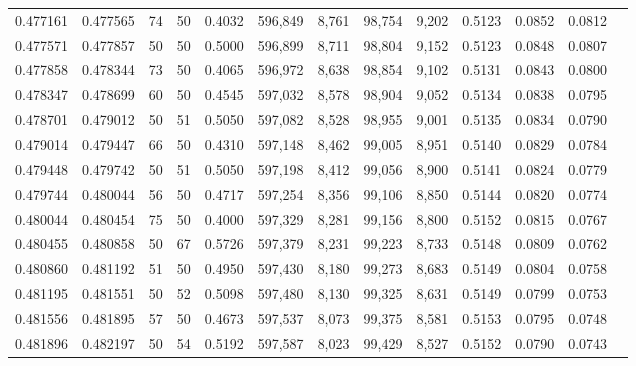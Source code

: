 \begin{tabular}{rrrrrrrrrrrrr}
0.477161 & 0.477565 &    74 &  50 &                                     0.4032 & 596,849 &   8,761 &  98,754 &   9,202 & 0.5123 & 0.0852 & 0.0812 \\
0.477571 & 0.477857 &    50 &  50 &                                     0.5000 & 596,899 &   8,711 &  98,804 &   9,152 & 0.5123 & 0.0848 & 0.0807 \\
0.477858 & 0.478344 &    73 &  50 &                                     0.4065 & 596,972 &   8,638 &  98,854 &   9,102 & 0.5131 & 0.0843 & 0.0800 \\
0.478347 & 0.478699 &    60 &  50 &                                     0.4545 & 597,032 &   8,578 &  98,904 &   9,052 & 0.5134 & 0.0838 & 0.0795 \\
0.478701 & 0.479012 &    50 &  51 &                                     0.5050 & 597,082 &   8,528 &  98,955 &   9,001 & 0.5135 & 0.0834 & 0.0790 \\
0.479014 & 0.479447 &    66 &  50 &                                     0.4310 & 597,148 &   8,462 &  99,005 &   8,951 & 0.5140 & 0.0829 & 0.0784 \\
0.479448 & 0.479742 &    50 &  51 &                                     0.5050 & 597,198 &   8,412 &  99,056 &   8,900 & 0.5141 & 0.0824 & 0.0779 \\
0.479744 & 0.480044 &    56 &  50 &                                     0.4717 & 597,254 &   8,356 &  99,106 &   8,850 & 0.5144 & 0.0820 & 0.0774 \\
0.480044 & 0.480454 &    75 &  50 &                                     0.4000 & 597,329 &   8,281 &  99,156 &   8,800 & 0.5152 & 0.0815 & 0.0767 \\
0.480455 & 0.480858 &    50 &  67 &                                     0.5726 & 597,379 &   8,231 &  99,223 &   8,733 & 0.5148 & 0.0809 & 0.0762 \\
0.480860 & 0.481192 &    51 &  50 &                                     0.4950 & 597,430 &   8,180 &  99,273 &   8,683 & 0.5149 & 0.0804 & 0.0758 \\
0.481195 & 0.481551 &    50 &  52 &                                     0.5098 & 597,480 &   8,130 &  99,325 &   8,631 & 0.5149 & 0.0799 & 0.0753 \\
0.481556 & 0.481895 &    57 &  50 &                                     0.4673 & 597,537 &   8,073 &  99,375 &   8,581 & 0.5153 & 0.0795 & 0.0748 \\
0.481896 & 0.482197 &    50 &  54 &                                     0.5192 & 597,587 &   8,023 &  99,429 &   8,527 & 0.5152 & 0.0790 & 0.0743 \\

\end{tabular}
